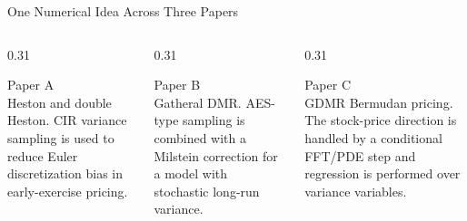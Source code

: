 \begin{frame}{One Numerical Idea Across Three Papers}

  \vspace{0.6em}
  \begin{columns}[T,onlytextwidth]
    \begin{column}{0.31\textwidth}
      \begin{block}{Paper A}
        \\
        Heston and double Heston. CIR variance sampling is used to reduce Euler discretization bias in early-exercise pricing.
      \end{block}
    \end{column}
    \begin{column}{0.31\textwidth}
      \begin{block}{Paper B}
        \\
        Gatheral DMR. AES-type sampling is combined with a Milstein correction for a model with stochastic long-run variance.
      \end{block}
    \end{column}
    \begin{column}{0.31\textwidth}
      \begin{block}{Paper C}
        \\
        GDMR Bermudan pricing. The stock-price direction is handled by a conditional FFT/PDE step and regression is performed over variance variables.
      \end{block}
    \end{column}
  \end{columns}
\end{frame}

